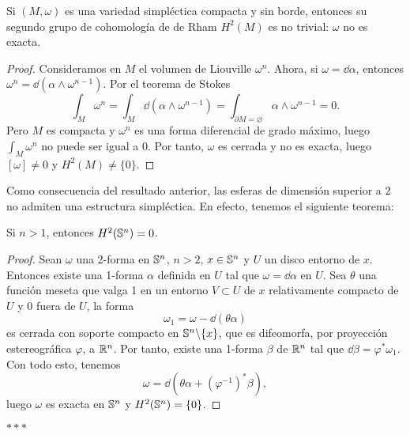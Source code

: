 \begin{prop}
  Si $(M,\omega)$ es una variedad simpléctica compacta y sin borde, entonces su segundo grupo de cohomología de de Rham $H^2(M)$ es no trivial: $\omega$ no es exacta.
\end{prop}
\begin{proof}
  Consideramos en $M$ el volumen de Liouville $\omega^n$. Ahora, si $\omega=\dd \alpha$, entonces $\omega^n=\dd (\alpha \wedge \omega^{n-1})$. Por el teorema de Stokes
  \begin{equation*}
    \int_M \omega^n=\int_M \dd (\alpha \wedge \omega^{n-1}) = \int_{\partial M=\varnothing} \alpha \wedge \omega^{n-1}=0.
  \end{equation*}
  Pero $M$ es compacta y $\omega^n$ es una forma diferencial de grado máximo, luego $\int_M \omega^n$ no puede ser igual a $0$. Por tanto, $\omega$ es cerrada y no es exacta, luego $[\omega]\neq 0$ y $H^2(M) \neq \{0\}$.
\end{proof}

Como consecuencia del resultado anterior, las esferas de dimensión superior a $2$ no admiten una estructura simpléctica. En efecto, tenemos el siguiente teorema:

\begin{thm}
  Si $n>1$, entonces $H^2(\mathbb{S}^n)={0}$.
\end{thm}

\begin{proof}
  Sean $\omega$ una 2-forma en $\mathbb{S}^n$, $n>2$, $x\in \mathbb{S}^n$ y $U$ un disco entorno de $x$. Entonces existe una 1-forma $\alpha$ definida en $U$ tal que $\omega=\dd \alpha$ en $U$. Sea $\theta$ una función meseta que valga 1 en un entorno $V\subset U$ de $x$ relativamente compacto de $U$ y $0$ fuera de $U$, la forma 
  \begin{equation*}
    \omega_1=\omega - \dd(\theta \alpha)
  \end{equation*}
  es cerrada con soporte compacto en $\mathbb{S}^n \backslash \{x\}$, que es difeomorfa, por proyección estereográfica $\varphi$, a $\mathbb{R}^n$. Por tanto, existe una 1-forma $\beta$ de $\mathbb{R}^n$ tal que $\dd \beta = \varphi^* \omega_1$. Con todo esto, tenemos
  \begin{equation*}
    \omega=\dd\left(\theta \alpha + \left( \varphi^{-1} \right)^* \beta \right) ,
  \end{equation*}
  luego $\omega$ es exacta en $\mathbb{S}^n$ y 
$    H^2(\mathbb{S}^n)= \{0\}$.
\end{proof}
  \begin{center}  $\ast\ast\ast$ \end{center}


